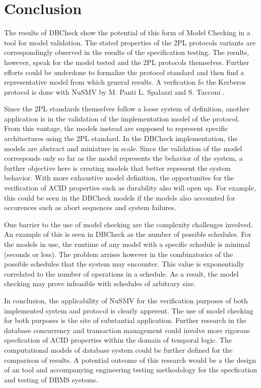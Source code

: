 \section{Conclusion}
The results of DBCheck show the potential of this form of Model Checking in a tool for model validation. The stated properties of the 2PL protocols variants are correspondingly observed in the results of the specification testing. The results, however, speak for the model tested and the 2PL protocols themselves. Further efforts could be underdone to formalize the protocol standard and then find a representative model from which general results. A verfication fo the Kerberos protocol is done with NuSMV by M. Panti L. Spalazzi and S. Tacconi \cite{kerberos}. 

Since the 2PL standards themselves follow a loose system of definition, another application is in the validation of the implementation model of the protocol. From this vantage, the models instead are supposed to represent specific architectures using the 2PL standard. In the DBCheck implementation, the models are abstract and miniature in scale. Since the validation of the model corresponds only so far as the model represents the behavior of the system, a further objective here is creating models that better represent the system behavior. With more exhaustive model definition, the opportunites for the verification of ACID properties such as durability also will open up. For example, this could be seen in the DBCheck models if the models also accounted for occurences such as abort sequences and system failures.

One barrier to the use of model checking are the complexity challenges involved. An example of this is seen in DBCheck as the number of possible schedules. For the models in use, the runtime of any model with a specific schedule is minimal (seconds or less). The problem arrises however in the combinatorics of the possible schedules that the system may encounter. This value is exponentially correlated to the number of operations in a schedule. As a result, the model checking may prove infeasible with schedules of arbitrary size. 

In conclusion, the applicability of NuSMV for the verification purposes of both implemented system and protocol is clearly apperent. The use of model checking for both purposes is the site of substantial application. Further research in the database concurrency and transaction management could involve more rigorous specfication of ACID properties within the domain of temporal logic. The computational models of database system could be further defined for the comparison of results. A potential outcome of this research would be a the design of an tool and accompanying engineering testing methodology for the specfication and testing of DBMS systems.

